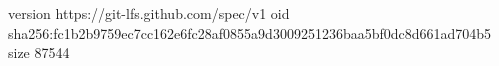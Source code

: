 version https://git-lfs.github.com/spec/v1
oid sha256:fc1b2b9759ec7cc162e6fc28af0855a9d3009251236baa5bf0dc8d661ad704b5
size 87544
